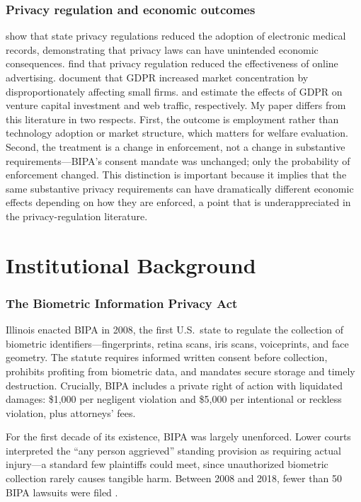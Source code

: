 \documentclass[12pt]{article}
\begin{document}
\subsubsection*{Privacy regulation and economic outcomes} \citet{millertuck2009} show that state privacy regulations reduced the adoption of electronic medical records, demonstrating that privacy laws can have unintended economic consequences. \citet{goldfarb2011} find that privacy regulation reduced the effectiveness of online advertising. \citet{johnson2021} document that GDPR increased market concentration by disproportionately affecting small firms. \citet{jia2021} and \citet{peukert2022} estimate the effects of GDPR on venture capital investment and web traffic, respectively. My paper differs from this literature in two respects. First, the outcome is employment rather than technology adoption or market structure, which matters for welfare evaluation. Second, the treatment is a change in enforcement, not a change in substantive requirements---BIPA's consent mandate was unchanged; only the probability of enforcement changed. This distinction is important because it implies that the same substantive privacy requirements can have dramatically different economic effects depending on how they are enforced, a point that is underappreciated in the privacy-regulation literature.

\section{Institutional Background}
\label{sec:background}

\subsubsection*{The Biometric Information Privacy Act} Illinois enacted BIPA in 2008, the first U.S.\ state to regulate the collection of biometric identifiers---fingerprints, retina scans, iris scans, voiceprints, and face geometry. The statute requires informed written consent before collection, prohibits profiting from biometric data, and mandates secure storage and timely destruction. Crucially, BIPA includes a private right of action with liquidated damages: \$1,000 per negligent violation and \$5,000 per intentional or reckless violation, plus attorneys' fees.

For the first decade of its existence, BIPA was largely unenforced. Lower courts interpreted the ``any person aggrieved'' standing provision as requiring actual injury---a standard few plaintiffs could meet, since unauthorized biometric collection rarely causes tangible harm. Between 2008 and 2018, fewer than 50 BIPA lawsuits were filed \citep{greenwald2022}.
\end{document}
